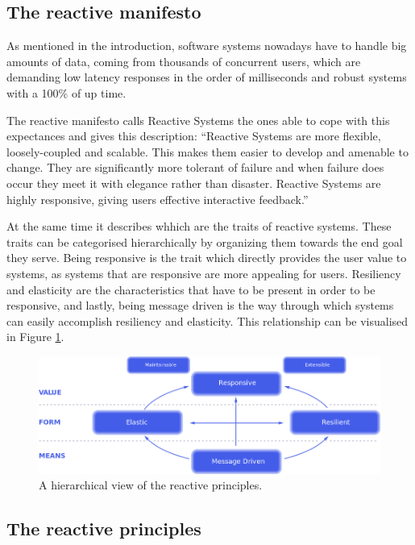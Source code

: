 \documentclass[../main.tex]{subfiles}
\begin{document}
\subsection{The reactive manifesto}

As mentioned in the introduction, software systems nowadays have to handle big amounts of data,
coming from thousands of concurrent users, which are demanding low latency responses in the order of
milliseconds and robust systems with a 100\% of up time.


The reactive manifesto \autocite{2014TheManifesto} calls Reactive Systems the
ones able to cope with this expectances and gives this description: ``Reactive
Systems are more flexible, loosely-coupled and scalable. This makes them easier
to develop and amenable to change. They are significantly more tolerant of
failure and when failure does occur they meet it with elegance rather than
disaster. Reactive Systems are highly responsive, giving users effective
interactive feedback.''

At the same time it describes whhich are the traits of reactive systems. These
traits can be categorised hierarchically by organizing them towards the end goal they serve. Being
responsive is the trait which directly provides the user value to systems, as systems that are responsive
are more appealing for users. Resiliency and elasticity are the characteristics that
have to be present in order to be responsive, and lastly, being message driven is the way
through which systems can easily accomplish resiliency and elasticity. This relationship can be visualised in Figure
\ref{fig:reactive}.

\begin{figure}[ht] \centering
\includegraphics[width=\textwidth]{images/reactive-traits.png}
    \caption{A hierarchical view of the reactive principles.}
    \label{fig:reactive}
\end{figure}

\subsection{The reactive principles}
\end{document}
